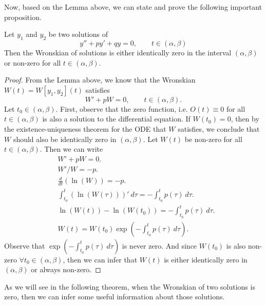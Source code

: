 Now, based on the Lemma above, we can state and prove the following important proposition.
\begin{proposition}
	Let $ y_1 $ and $ y_2 $ be two solutions of 
	\[ y'' + py' + qy = 0, \qquad t\in (\alpha,\beta)\]
	Then the Wronskian of solutions is either identically zero in the interval $ (\alpha,\beta) $ or non-zero for all $ t \in (\alpha, \beta) $.
\end{proposition}
\begin{proof}
	From the Lemma above, we know that the Wronskian $ W(t) = W[y_1,y_2](t) $ satisfies 
	\[ W' + p W = 0, \qquad t\in (\alpha,\beta). \]
	Let $ t_0 \in (\alpha,\beta) $. First, observe that the zero function, i.e. $ O(t) \equiv 0 $ for all $ t\in(\alpha,\beta) $ is also a solution to the differential equation. If $ W(t_0)= 0 $, then by the existence-uniqueness theorem for the ODE that $ W $ satisfies, we conclude that $ W $ should also be identically zero in $ (\alpha,\beta) $. Let $ W(t) $ be non-zero for all $ t\in(\alpha,\beta) $. Then we can write
	\begin{align*}
		&W' + pW = 0. \\
		&W'/W = -p.\\
		&\frac{d}{dt} (\ln(W)) = -p.\\
		&\int_{t_0}^{t} (\ln(W(\tau)))'\ d\tau = -\int_{t_0}^{t} p(\tau)\ d\tau.\\
		& \ln(W(t)) - \ln(W(t_0)) = - \int_{t_0}^{t}p(\tau)\ d\tau. \\
		& W(t) = W(t_0)\exp(-\int_{t_0}^{t}p(\tau)\ d\tau).
	\end{align*}
	Observe that $ \exp(-\int_{t_0}^{t}p(\tau)\ d\tau) $ is never zero. And since $ W(t_0) $ is also non-zero $ \forall t_0 \in (\alpha,\beta) $, then we can infer that $ W(t) $ is either identically zero in $ (\alpha,\beta) $ or always non-zero.
\end{proof}


As we will see in the following theorem, when the Wronskian of two solutions is zero, then we can infer some useful information about those solutions.


